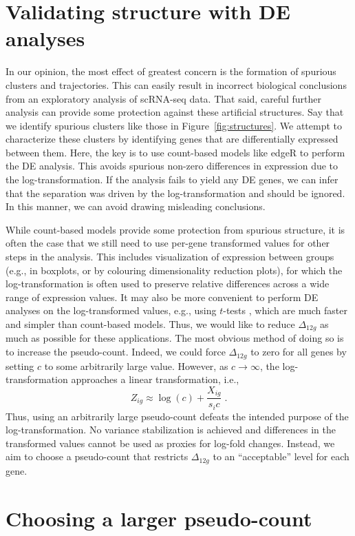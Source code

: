 \documentclass[10pt,letterpaper]{article}
\begin{document}
\section{Validating structure with DE analyses}
In our opinion, the most effect of greatest concern is the formation of spurious clusters and trajectories.
This can easily result in incorrect biological conclusions from an exploratory analysis of scRNA-seq data.
That said, careful further analysis can provide some protection against these artificial structures.
Say that we identify spurious clusters like those in Figure~\ref{fig:structures}.
We attempt to characterize these clusters by identifying genes that are differentially expressed between them.
Here, the key is to use count-based models like edgeR \cite{robinson2010edgeR} to perform the DE analysis.
This avoids spurious non-zero differences in expression due to the log-transformation.
If the analysis fails to yield any DE genes, we can infer that the separation was driven by the log-transformation and should be ignored.
In this manner, we can avoid drawing misleading conclusions.

While count-based models provide some protection from spurious structure, it is often the case that we still need to use per-gene transformed values for other steps in the analysis.
This includes visualization of expression between groups (e.g., in boxplots, or by colouring dimensionality reduction plots), for which the log-transformation is often used to preserve relative differences across a wide range of expression values.
It may also be more convenient to perform DE analyses on the log-transformed values, e.g., using $t$-tests \cite{law2014voom}, which are much faster and simpler than count-based models.
Thus, we would like to reduce $\Delta_{12g}$ as much as possible for these applications.
The most obvious method of doing so is to increase the pseudo-count.
Indeed, we could force $\Delta_{12g}$ to zero for all genes by setting $c$ to some arbitrarily large value.
However, as $c \to \infty$, the log-transformation approaches a linear transformation, i.e.,
\[
    Z_{ig} \approx \log(c) + \frac{X_{ig}}{s_i c} \;.
\]
Thus, using an arbitrarily large pseudo-count defeats the intended purpose of the log-transformation. 
No variance stabilization is achieved and differences in the transformed values cannot be used as proxies for log-fold changes. 
Instead, we aim to choose a pseudo-count that restricts $\Delta_{12g}$ to an ``acceptable'' level for each gene.

\section{Choosing a larger pseudo-count}
\end{document}
